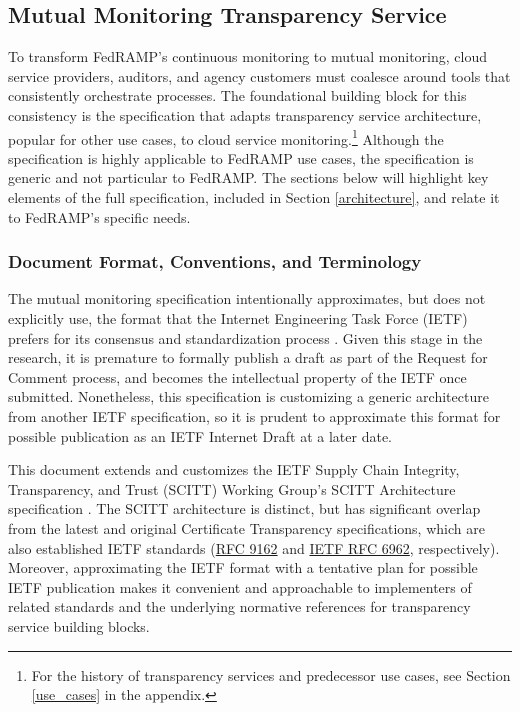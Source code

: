 \documentclass{jdf}
\begin{document}
\subsection{Mutual Monitoring Transparency Service}

To transform FedRAMP's continuous monitoring to mutual monitoring, cloud service providers, auditors, and agency customers must coalesce around tools that consistently orchestrate processes. The foundational building block for this consistency is the  specification that adapts transparency service architecture, popular for other use cases, to cloud service monitoring.\footnote{For the history of transparency services and predecessor use cases, see Section \ref{use_cases} in the appendix.} Although the specification is highly applicable to FedRAMP use cases, the specification is generic and not particular to FedRAMP. The sections below will highlight key elements of the full specification, included in Section \ref{architecture}, and relate it to FedRAMP's specific needs.

\subsubsection{Document Format, Conventions, and Terminology}

The mutual monitoring specification intentionally approximates, but does not explicitly use, the format that the Internet Engineering Task Force (IETF) prefers for its consensus and standardization process \citeyear{ietf_authors_format}. Given this stage in the research, it is premature to formally publish a draft as part of the Request for Comment process, and becomes the intellectual property of the IETF once submitted. Nonetheless, this specification is customizing a generic architecture from another IETF specification, so it is prudent to approximate this format for possible publication as an IETF Internet Draft at a later date. 

This document extends and customizes the IETF Supply Chain Integrity, Transparency, and Trust (SCITT) Working Group's SCITT Architecture specification \citeyear{scitt25}. The SCITT architecture is distinct, but has significant overlap from the latest and original Certificate Transparency specifications, which are also established IETF standards (\href{https://datatracker.ietf.org/doc/html/rfc9162}{RFC 9162} and \href{https://datatracker.ietf.org/doc/html/rfc6962}{IETF RFC 6962}, respectively). Moreover, approximating the IETF format with a tentative plan for possible IETF publication makes it convenient and approachable to implementers of related standards and the underlying normative references for transparency service building blocks.
\end{document}
